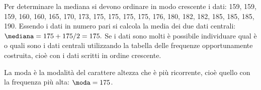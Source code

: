 \begin{exrig}
\begin{esempio}
Per determinare la mediana si devono ordinare in modo crescente i dati:
159, 159, 159, 160, 160, 165, 170, 173, 175, 175, 175, 175, 176, 180, 182, 182, 185, 185, 185, 190.
Essendo i dati in numero pari si calcola la media dei due dati centrali:
$\mediana = {175+175}/{2}=175.$
Se i dati sono molti è possibile individuare qual è o quali sono i dati centrali utilizzando la tabella delle
frequenze opportunamente costruita, cioè con i dati scritti in ordine crescente.

La moda è la modalità del carattere altezza che è più ricorrente, cioè quello con la frequenza più alta:
$\moda = 175$.
\end{esempio}
\end{exrig}








